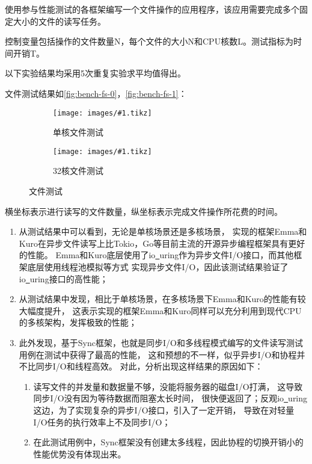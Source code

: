 \documentclass[supercite]{HustGraduPaper}
\newcommand{\cfig}[3]{
  \begin{figure}[htb]
    \centering
    \texttt{[image: images/\#1.tikz]}
    \caption{#3}
    \label{fig:#1}
  \end{figure}
}
\newcommand{\sfig}[3]{
  \begin{subfigure}[b]{#2\textwidth}
    \texttt{[image: images/\#1.tikz]}
    \caption{#3}
    \label{fig:#1}
  \end{subfigure}
}
\newcommand{\xfig}[3]{
  \begin{figure}[htb]
    \centering
    #3
    \caption{#2}
    \label{fig:#1}
  \end{figure}
}
\newcommand{\rfig}[1]{\autoref{fig:#1}}
\theoremstyle{definition}
\begin{document}
使用参与性能测试的各框架编写一个文件操作的应用程序，该应用需要完成多个固定大小的文件的读写任务。\par

控制变量包括操作的文件数量N，每个文件的大小N和CPU核数L。测试指标为时间开销T。\par

以下实验结果均采用5次重复实验求平均值得出。\par

文件测试结果如\rfig{bench-fs-0}，\rfig{bench-fs-1}：

%

\xfig{bench-fs}{文件测试}{
  \sfig{bench-fs-0}{0.4}{单核文件测试}
  \sfig{bench-fs-1}{0.4}{32核文件测试}
}

横坐标表示进行读写的文件数量，纵坐标表示完成文件操作所花费的时间。\par


\begin{enumerate}[label={(\arabic*)}]
  \item 从测试结果中可以看到，无论是单核场景还是多核场景，
    实现的框架Emma和Kuro在异步文件读写上比Tokio，Go等目前主流的开源异步编程框架具有更好的性能。
    Emma和Kuro底层使用了io\underline{~}uring作为异步文件I/O接口，而其他框架底层使用线程池模拟等方式
    实现异步文件I/O，因此该测试结果验证了io\underline{~}uring接口的高性能；
  \item 从测试结果中发现，相比于单核场景，在多核场景下Emma和Kuro的性能有较大幅度提升，
    这表示实现的框架Emma和Kuro同样可以充分利用到现代CPU的多核架构，发挥极致的性能；
  \item 此外发现，基于Sync框架，也就是同步I/O和多线程模式编写的文件读写测试用例在测试中获得了最高的性能，
    这和预想的不一样，似乎异步I/O和协程并不比同步I/O和线程高效。
    对此，分析出现这样结果的原因如下：
    \begin{enumerate}
      \item 读写文件的并发量和数据量不够，没能将服务器的磁盘I/O打满，
        这导致同步I/O没有因为等待数据而阻塞太长时间，
        很快便返回了；反观io\underline{~}uring这边，为了实现复杂的异步I/O接口，引入了一定开销，
        导致在对轻量I/O任务的执行效率上不及同步I/O；
      \item 在此测试用例中，Sync框架没有创建太多线程，因此协程的切换开销小的性能优势没有体现出来。
    \end{enumerate}
\end{enumerate}
\end{document}
